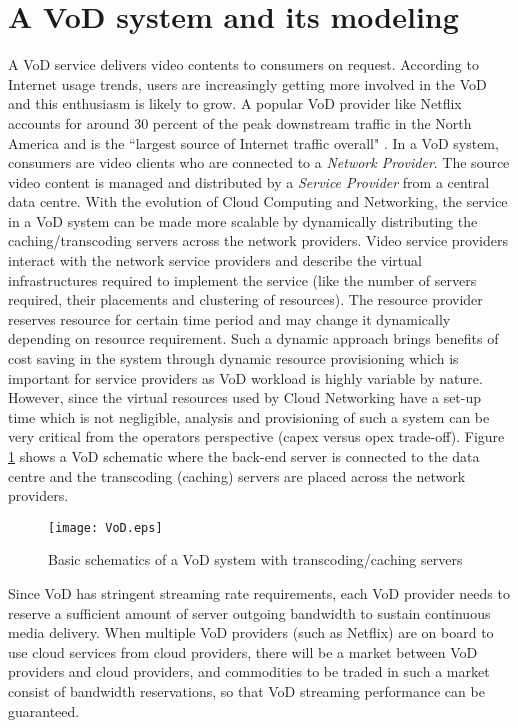 \documentclass[twoside]{article}
\begin{document}
\section{A VoD system and its modeling}
\label{sec:vod}
A VoD service delivers video contents to consumers on request. According to Internet usage trends, users are increasingly getting more involved in the VoD and this enthusiasm is likely to grow. A popular VoD provider like Netflix accounts for around 30 percent of  the peak downstream traffic in the North America and is the ``largest source of Internet traffic overall" \cite{website:sandvine}. In a VoD system, consumers are video clients who are connected to a \textit{Network Provider}. The source video content is managed and distributed by a \textit{Service Provider} from a central data centre. With the evolution of Cloud Computing {and Networking}, the service in a VoD system can be made more scalable by dynamically distributing the caching/transcoding servers across the network providers. Video service providers interact with the network service providers and describe the virtual infrastructures required to implement the service (like the number of servers required, their placements and clustering of resources). The resource provider reserves resource for certain time period and may change it dynamically depending on resource requirement. Such a dynamic approach brings benefits of cost saving in the system through dynamic resource provisioning which is important for service providers as VoD workload is highly variable by nature. However, since {the virtual resources used by Cloud Networking}  have a set-up time which is not negligible, analysis and provisioning of such a system can be very critical from the operators perspective ({\sc capex} versus {\sc opex} trade-off). Figure \ref{fig:VoD} shows a VoD schematic where the back-end server is connected to the data centre and the transcoding (caching) servers are placed across the network providers.
\begin{figure}[h]
\centering
\texttt{[image: VoD.eps]}
\caption{\small Basic schematics of a VoD system with transcoding/caching servers}
\label{fig:VoD}
\end{figure}
Since VoD has stringent streaming rate requirements, each VoD provider needs to reserve a sufficient amount of server outgoing bandwidth to sustain continuous media delivery. When multiple VoD providers (such as Netflix) are on board to use cloud services from cloud providers, there will be a market between VoD providers and cloud providers, and commodities to be traded in such a market consist of bandwidth reservations, so that VoD streaming performance can be guaranteed.
\end{document}
